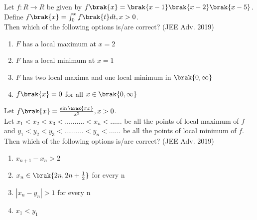     \item{
        
            Let $f: R\rightarrow R$ be given by $f\brak{x} = \brak{x-1}\brak{x-2}\brak{x-5}$.\\[6pt] 
            Define $f\brak{x} = \int_0^x f\brak{t}dt, x>0$.\\[3pt]
            Then which of the following options is/are correct?
             \hfill
                {(JEE Adv. 2019)}
            
            \begin{enumerate}
                \item $F$ has a local maximum at $x=2$
                \item $F$ has a local minimum at $x=1$
                \item $F$ has two local maxima and one local minimum in $\brak{0,\infty}$
                \item $f\brak{x} = 0$ for all $x \in \brak{0,\infty}$
            \end{enumerate}
        
        }
        
    \item{
        
            Let $f\brak{x} = \frac{\sin\brak{\pi x}}{x^2}, x>0$.\\[3pt]
            Let $x_1 < x_2 < x_3 < .......... <x_n <......$ be all the points of local maximum of $f$ and $y_1 < y_2 < y_3 < .......... <y_n <......$ be all the points of local minimum of $f$.\\
            Then which of the following options is/are correct?
             \hfill
                {(JEE Adv. 2019)}
            
            \begin{multicols}{2}
                \begin{enumerate}
                    \item $x_{n+1} - x_{n} > 2$ 
                    \item $x_{n} \in \brak{2n, 2n+\frac{1}{2}}$ for every n
                    \item $|x_{n} - y_{n}|> 1 $ for every n
                    \item $x_{1} < y_{1}$
                \end{enumerate}
            \end{multicols}
        
        }


